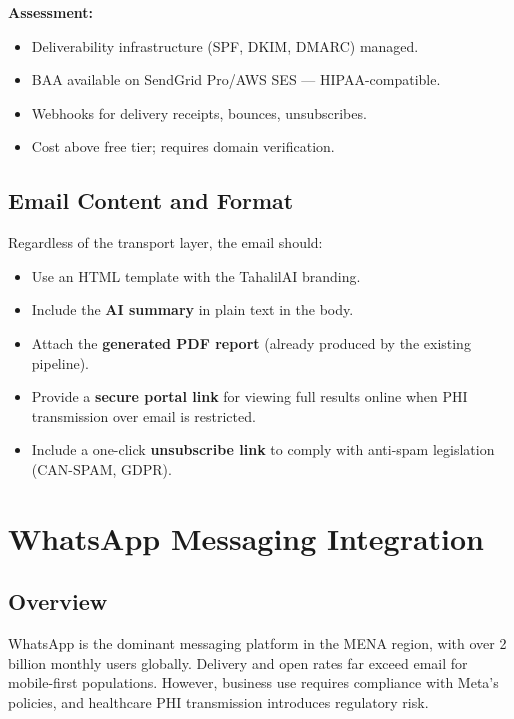 \documentclass[12pt,a4paper]{article}
\newcommand{\pro}{\textcolor{green}{\textbf{+}}}
\newcommand{\con}{\textcolor{red}{\textbf{--}}}
\begin{document}
\noindent\textbf{Assessment:}
\begin{itemize}[leftmargin=2em, itemsep=2pt]
    \item[\pro] Deliverability infrastructure (SPF, DKIM, DMARC) managed.
    \item[\pro] BAA available on SendGrid Pro/AWS SES --- HIPAA-compatible.
    \item[\pro] Webhooks for delivery receipts, bounces, unsubscribes.
    \item[\con] Cost above free tier; requires domain verification.
\end{itemize}

\subsection{Email Content and Format}

Regardless of the transport layer, the email should:

\begin{itemize}[leftmargin=2em, itemsep=2pt]
    \item Use an HTML template with the TahalilAI branding.
    \item Include the \textbf{AI summary} in plain text in the body.
    \item Attach the \textbf{generated PDF report} (already produced by the
          existing pipeline).
    \item Provide a \textbf{secure portal link} for viewing full results
          online when PHI transmission over email is restricted.
    \item Include a one-click \textbf{unsubscribe link} to comply with
          anti-spam legislation (CAN-SPAM, GDPR).
\end{itemize}

\section{WhatsApp Messaging Integration}

\subsection{Overview}

WhatsApp is the dominant messaging platform in the MENA region, with over
2 billion monthly users globally. Delivery and open rates far exceed email
for mobile-first populations. However, business use requires compliance with
Meta's policies, and healthcare PHI transmission introduces regulatory risk.
\end{document}
